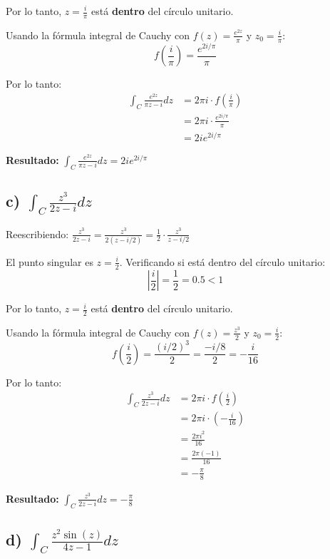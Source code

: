 \documentclass{article}
\begin{document}
Por lo tanto, $z = \frac{i}{\pi}$ está \textbf{dentro} del círculo unitario.

Usando la fórmula integral de Cauchy con $f(z) = \frac{e^{2z}}{\pi}$ y $z_0 = \frac{i}{\pi}$:
$$f\left(\frac{i}{\pi}\right) = \frac{e^{2i/\pi}}{\pi}$$

Por lo tanto:
\begin{align*}
\int_C \frac{e^{2z}}{\pi z - i} dz &= 2\pi i \cdot f\left(\frac{i}{\pi}\right) \\
                                   &= 2\pi i \cdot \frac{e^{2i/\pi}}{\pi} \\
                                   &= 2i e^{2i/\pi}
\end{align*}

\textbf{Resultado:} $\int_C \frac{e^{2z}}{\pi z - i} dz = 2i e^{2i/\pi}$

\subsection*{c) $\int_C \frac{z^3}{2z - i} dz$}

Reescribiendo: $\frac{z^3}{2z - i} = \frac{z^3}{2(z - i/2)} = \frac{1}{2} \cdot \frac{z^3}{z - i/2}$

El punto singular es $z = \frac{i}{2}$. Verificando si está dentro del círculo unitario:
$$\left|\frac{i}{2}\right| = \frac{1}{2} = 0.5 < 1$$

Por lo tanto, $z = \frac{i}{2}$ está \textbf{dentro} del círculo unitario.

Usando la fórmula integral de Cauchy con $f(z) = \frac{z^3}{2}$ y $z_0 = \frac{i}{2}$:
$$f\left(\frac{i}{2}\right) = \frac{(i/2)^3}{2} = \frac{-i/8}{2} = -\frac{i}{16}$$

Por lo tanto:
\begin{align*}
\int_C \frac{z^3}{2z - i} dz &= 2\pi i \cdot f\left(\frac{i}{2}\right) \\
                              &= 2\pi i \cdot \left(-\frac{i}{16}\right) \\
                              &= \frac{2\pi i^2}{16} \\
                              &= \frac{2\pi (-1)}{16} \\
                              &= -\frac{\pi}{8}
\end{align*}

\textbf{Resultado:} $\int_C \frac{z^3}{2z - i} dz = -\frac{\pi}{8}$

\subsection*{d) $\int_C \frac{z^2 \sin(z)}{4z - 1} dz$}
\end{document}
